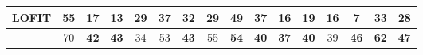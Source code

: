 \begin{table}[!thp]
{\begin{tabular}{lccccccccccccccc}
\textbf{LOFIT}      & 55               & 17                & 13                 & 29                        & 37                 & 32                   & 29              & 49               & 37           & 16            & 19             & 16                  & 7                & 33                  & 28             \\
\midrule
\textbf{\jola{}}        & 70               & \textbf{42}       & \textbf{43}        & 34                        & 53                 & \textbf{43}          & 55              & \textbf{54}      & \textbf{40}  & \textbf{37}   & \textbf{40}    & 39                  & \textbf{46}      & \textbf{62}         & \textbf{47}   \\
\bottomrule
\end{tabular}
}
\end{table}



